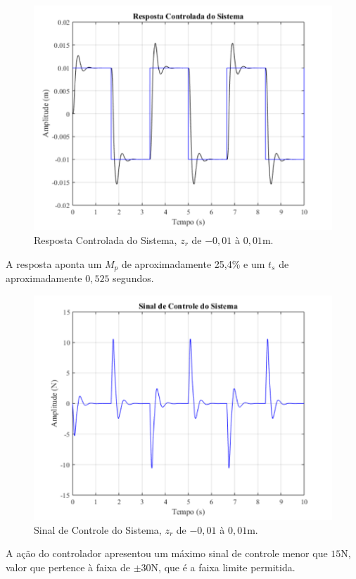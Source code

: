 \documentclass[journal,brazil,english]{IEEEtran}
\begin{document}
\begin{figure}[H]
	\centering
\includegraphics[width=\columnwidth]{./imagens/quanserE.pdf}
    \renewcommand{\figurename}{Fig.}
    \caption{Resposta Controlada do Sistema, $z_r$ de $-0,01$ à $0,01$m.}
	\label{quanserE}
\end{figure}
A resposta aponta um $M_p$ de aproximadamente 25,4\% e um $t_s$ de aproximadamente $0,525$ segundos.

\begin{figure}[H]
	\centering
\includegraphics[width=\columnwidth]{./imagens/quanserE2.pdf}
    \renewcommand{\figurename}{Fig.}
    \caption{Sinal de Controle do Sistema, $z_r$ de $-0,01$ à $0,01$m.}
	\label{quanserE2}
\end{figure}
A ação do controlador apresentou um máximo sinal de controle menor que $15$N, valor que pertence à faixa de $\pm 30$N, que é a faixa limite permitida.
\end{document}
